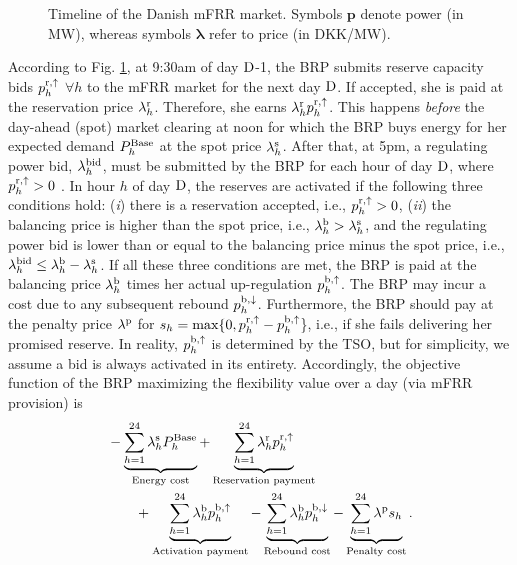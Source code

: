 \begin{figure}[!t]
    \centering
    
    \caption{Timeline of the Danish mFRR market. Symbols $\bm{p}$ denote power (in MW), whereas symbols  $\bm{\lambda}$ refer to price (in DKK/MW).}
    \label{fig:timeline_mfrr}
    \vspace{-3mm}
\end{figure}


According to Fig. \ref{fig:timeline_mfrr}, at 9:30am of day $\rm{D}$-1, the BRP submits reserve capacity bids $p_{h}^{\rm{r},\uparrow}$ $\forall{h}$ to the mFRR market for the next day $\rm{D}$. If accepted, she is paid at the reservation price $\lambda_{h}^{\rm{r}}$. Therefore, she earns $\lambda_{h}^{\rm{r}}p_{h}^{\rm{r},\uparrow}$. This happens \textit{before} the day-ahead (spot) market clearing at noon for which the BRP buys energy for her expected demand $P_{h}^{\rm{Base}}$ at the spot price $\lambda_{h}^{\rm{s}}$. After that, at 5pm, a regulating power bid, $\lambda_{h}^{\rm{bid}}$, must be submitted by the BRP for each hour of day $\rm{D}$, where $p_{h}^{\rm{r},\uparrow} > 0$ \cite{energinet:Systemydelser}. In hour $h$ of day $\rm{D}$, the reserves are activated if the following three conditions hold: (\textit{i}) there is a reservation accepted, i.e., $p_{h}^{\rm{r},\uparrow} > 0$, (\textit{ii}) the balancing price is higher than the spot price, i.e., $\lambda_{h}^{\rm{b}} > \lambda_{h}^{\rm{s}}$, and the regulating power bid is lower than or equal to the balancing price minus the spot price, i.e., $\lambda_{h}^{\rm{bid}} \leq  \lambda_{h}^{\rm{b}} - \lambda_{h}^{\rm{s}}$. If all these three conditions are met, the BRP is paid at the balancing price $\lambda_{h}^{\rm{b}}$ times her actual up-regulation $p_{h}^{\rm{b},\uparrow}$. The BRP may  incur a cost due to any subsequent rebound $p_{h}^{\rm{b},\downarrow}$. Furthermore, the BRP should pay at the penalty price $\lambda^{\rm{p}}$ for $s_{h} = \text{max}\{0, p_{h}^{\rm{r},\uparrow} - p_{h}^{\rm{b},\uparrow}$\}, i.e., if she fails delivering her promised reserve. In reality, $p_{h}^{\rm{b},\uparrow}$ is determined by the TSO, but for simplicity, we assume a bid is always activated in its entirety.
Accordingly, the objective function of the BRP maximizing the flexibility value over a day (via mFRR provision) is
%
\begin{align}\label{eq:mFRRObjective}
     & - \underbrace{\sum_{h=1}^{24} \lambda^{\rm{s}}_{h}P^{\rm{Base}}_{h}}_{\textrm{Energy cost}} + \underbrace{\sum_{h=1}^{24}\lambda_{h}^{\rm{r}} p^{\rm{r}, \uparrow}_{h}}_{\textrm{Reservation payment}}  \notag \\ & \quad \quad + \underbrace{\sum_{h=1}^{24}  \lambda_{h}^{\rm{b}} p^{\rm{b},\uparrow}_{h}}_{\textrm{Activation payment}} - \underbrace{\sum_{h=1}^{24}  \lambda_{h}^{\rm{b}} p^{\rm{b},\downarrow}_{h}}_{\textrm{Rebound cost}} - \underbrace{ \sum_{h=1}^{24}  \lambda^{\rm{p}}s_{h}}_{\textrm{Penalty cost}}.
\end{align}

